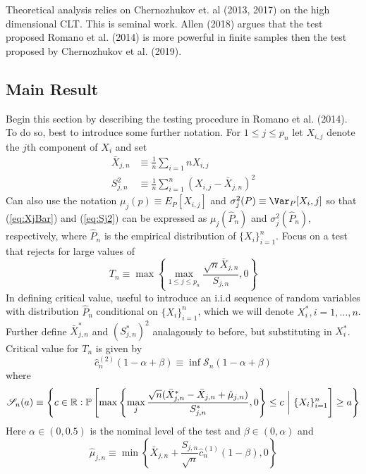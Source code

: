 Theoretical analysis relies on Chernozhukov et. al (2013, 2017) on the high dimensional CLT. This is seminal work. Allen (2018) argues that the test proposed Romano et al. (2014) is more powerful in finite samples then the test proposed by Chernozhukov et al. (2019). 

\subsection{Main Result}

Begin this section by describing the testing procedure in Romano et al. (2014). To do so, best to introduce some further notation. For $1\leq j\leq p_n$ let $X_{i,j}$ denote the $j$th component of $X_i$ and set 
\begin{align}
    \bar{X}_{j,n} &\equiv \frac{1}{n}\sum_{i=1}n X_{i,j} \label{eq:XjBar} \\
    S_{j,n}^2 &\equiv \frac{1}{n}\sum_{i=1}^n (X_{i,j} - \bar{X}_{j,n})^2 \label{eq:Sj2}
\end{align}
Can also use the notation $\mu_j(p) \equiv E_P[X_{i,j}]$ and $\sigma_j^2(P)\equiv \Var_{P}[X_i,j]$ so that (\ref{eq:XjBar}) and (\ref{eq:Sj2}) can be expressed as $\mu_j(\hat{P}_n)$ and $\sigma_j^2(\hat{P}_n)$, respectively, where $\hat{P}_n$ is the empirical distribution of $\{X_i\}_{i=1}^n$. Focus on a test that rejects for large values of 
\[T_n \equiv \max\left\{ \max_{1\leq j \leq p_n}\frac{\sqrt{n}\bar{X}_{j,n}}{S_{j,n}} ,0\right\}\] 
In defining critical value, useful to introduce an i.i.d sequence of random variables with distribution $\hat{P}_n$ conditional on $\{X_i\}_{i=1}^n$, which we will denote $X_i^*, i = 1, \dots, n$. Further define $\bar{X}_{j,n}^*$ and $(S_{j,n}^*)^2$ analagously to before, but substituting in $X_i^*$. Critical value for $T_n$ is given by 
\begin{equation}
	\label{eq:critVal}
	\hat{c}_n^{(2)}(1 - \alpha + \beta) \equiv \inf \mathscr{S}_n(1-\alpha +\beta)
\end{equation}
where 
\[\mathscr{S}_n(a) \equiv \left\{c\in \mathbb{R}: \mathbb{P}\left[\max\left\{ \max_j \frac{\sqrt{n}(\bar{X}_{j,n}^* - \bar{X}_{j,n} + \hat{\mu}_{j,n})}{S_{j,n}^*},0 \right\} \leq c \hbox{ }\bigg|\hbox{ } \{X_i\}_{i=1}^n\right] \geq a \right\}\]
Here $\alpha \in (0,0.5)$ is the nominal level of the test and $\beta \in (0,\alpha)$ and 
\begin{equation}
	\label{eq:muHat}
	\hat{\mu}_{j,n} \equiv \min\left\{\bar{X}_{j,n} + \frac{S_{j,n}}{\sqrt{n}} \hat{c}_n^{(1)}(1-\beta), 0\right\}
\end{equation}
